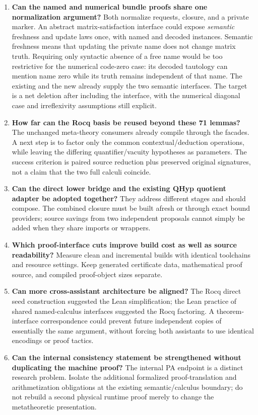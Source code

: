 \documentclass[11pt,letterpaper]{article}
\theoremstyle{definition}
\theoremstyle{remark}
\newcommand{\code}[1]{\texttt{\detokenize{#1}}}
\begin{document}
\begin{enumerate}
\item \textbf{Can the named and numerical bundle proofs share one normalization
      argument?} Both normalize requests, closure, and a private marker. An
      abstract matrix-satisfaction interface could expose \emph{semantic}
      freshness and update laws once, with named and decoded instances.
      Semantic freshness means that updating the private name does not change
      matrix truth. Requiring only syntactic absence of a free name would be
      too restrictive for the numerical code-zero case: its decoded tautology
      can mention name zero while its truth remains independent of that name.
      The existing \code{sat_dec_update} and the new \code{sat_update_fresh}
      already supply the two semantic interfaces. The target is a net
      deletion after including the interface, with the numerical diagonal case
      and irreflexivity assumptions still explicit.
\item \textbf{How far can the Rocq basis be reused beyond these 71 lemmas?}
      The unchanged meta-theory consumers already compile through the facades.
      A next step is to factor only the common contextual/deduction operations,
      while leaving the differing quantifier/vacuity hypotheses as parameters.
      The success criterion is paired source reduction plus preserved original
      signatures, not a claim that the two full calculi coincide.
\item \textbf{Can the direct lower bridge and the existing QHyp quotient adapter
      be adopted together?} They address different stages and should compose.
      The combined closure must be built afresh or through exact bound providers;
      source savings from two independent proposals cannot simply be added when
      they share imports or wrappers.
\item \textbf{Which proof-interface cuts improve build cost as well as source
      readability?} Measure clean and incremental builds with identical
      toolchains and resource settings. Keep generated certificate data,
      mathematical proof source, and compiled proof-object sizes separate.
\item \textbf{Can more cross-assistant architecture be aligned?} The Rocq direct
      seed construction suggested the Lean simplification; the Lean practice
      of shared named-calculus interfaces suggested the Rocq factoring. A
      theorem-interface correspondence could prevent future independent copies
      of essentially the same argument, without forcing both assistants to use
      identical encodings or proof tactics.
\item \textbf{Can the internal consistency statement be strengthened without
      duplicating the machine proof?} The internal PA endpoint is a distinct
      research problem. Isolate the additional formalized proof-translation and
      arithmetization obligations at the existing semantic/calculus boundary;
      do not rebuild a second physical runtime proof merely to change the
      metatheoretic presentation.
\end{enumerate}
\end{document}
